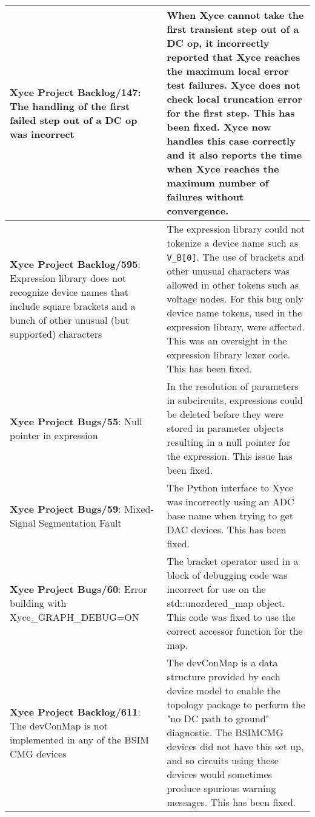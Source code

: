 {\begin{longtable}[h] {>{\raggedright\small}m{2in}|>{\raggedright\let\\\tabularnewline\small}m{3.5in}}
  \textbf{Xyce Project Backlog/147}: The handling of the first failed step out 
  of a DC op was incorrect & When Xyce cannot take the first transient step out
  of a DC op, it incorrectly reported that Xyce reaches the maximum local error
  test failures. Xyce does not check local truncation error for the first step.
  This has been fixed. Xyce now handles this case correctly and it also reports
  the time when Xyce reaches the maximum number of failures without
  convergence. \\ \hline   

 \textbf{Xyce Project Backlog/595}: 
   Expression library does not recognize device names that include square
    brackets and a bunch of other unusual (but supported) characters & 
   The expression library could not tokenize a device name such as \texttt{V\_B[0]}. 
   The use of brackets and other unusual characters was allowed in other tokens 
   such as voltage nodes.  For this bug only device name tokens, used in the expression 
   library, were affected.  This was an oversight in the expression library lexer code. 
   This has been fixed.  \\ \hline

  \textbf{Xyce Project Bugs/55}: Null pointer in expression &
  In the resolution of parameters in subcircuits, expressions
  could be deleted before they were stored in parameter objects
  resulting in a null pointer for the expression.  This issue
  has been fixed. \\ \hline
  
  
\textbf{Xyce Project Bugs/59}: Mixed-Signal Segmentation Fault &
  The Python interface to Xyce was incorrectly using an ADC 
  base name when trying to get DAC devices.  This has been fixed. \\ \hline

\textbf{Xyce Project Bugs/60}: Error building with Xyce\_GRAPH\_DEBUG=ON &
  The bracket operator used in a block of debugging code was incorrect
  for use on the std::unordered\_map object.  This code was fixed to use
  the correct accessor function for the map. \\ \hline

 \textbf{Xyce Project Backlog/611}: 
   The devConMap is not implemented in any of the BSIM CMG devices & 
   The devConMap is a data structure provided by each device model to enable 
   the topology package to perform the "no DC path to ground" diagnostic.
   The BSIMCMG devices did not have this set up, and so circuits using 
   these devices would sometimes produce spurious warning messages.  
   This has been fixed.  \\ \hline


\end{longtable}}
